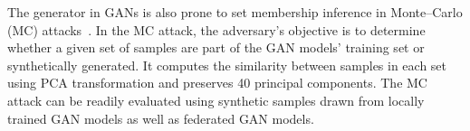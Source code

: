 \documentclass[conference]{IEEEtran}
\begin{document}





The generator in GANs is also prone to set membership inference in Monte–Carlo (MC) attacks~\cite{MCAttackHilprecht2019}. In the MC attack, the adversary's objective is to determine whether a given set of samples are part of the GAN models' training set or synthetically generated. It computes the similarity between samples in each set using PCA transformation and preserves 40 principal components.  The MC attack can be readily evaluated using synthetic samples drawn from locally trained GAN models as well as federated GAN models. 
\end{document}
